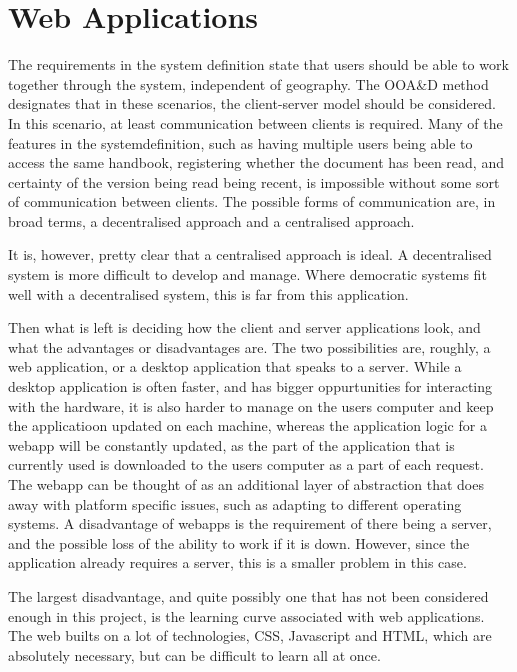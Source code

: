 \section{Web Applications}
The requirements in the system definition state that users should be able to work together through the system, independent of geography.
The OOA\&D method designates that in these scenarios, the client-server model should be considered.
In this scenario, at least communication between clients is required. Many of the features in the systemdefinition, such as having multiple users being able to access the same handbook, registering whether the document has been read, and certainty of the version being read being recent, is impossible without some sort of communication between clients. The possible forms of communication are, in broad terms, a decentralised approach and a centralised approach.

It is, however, pretty clear that a centralised approach is ideal. A decentralised system is more difficult to develop and manage. Where democratic systems fit well with a decentralised system, this is far from this application.

Then what is left is deciding how the client and server applications look, and what the advantages or disadvantages are. The two possibilities are, roughly, a web application, or a desktop application that speaks to a server. While a desktop application is often faster, and has bigger oppurtunities for interacting with the hardware, it is also harder to manage on the users computer and keep the applicatioon updated on each machine, whereas the application logic for a webapp will be constantly updated, as the part of the application that is currently used is downloaded to the users computer as a part of each request. The webapp can be thought of as an additional layer of abstraction that does away with platform specific issues, such as adapting to different operating systems. A disadvantage of webapps is the requirement of there being a server, and the possible loss of the ability to work if it is down. However, since the application already requires a server, this is a smaller problem in this case.

The largest disadvantage, and quite possibly one that has not been considered enough in this project, is the learning curve associated with web applications. The web builts on a lot of technologies, CSS, Javascript and HTML, which are absolutely necessary, but can be difficult to learn all at once.

